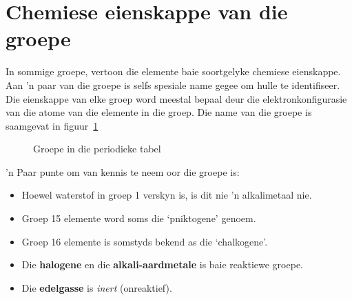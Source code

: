 \section{Chemiese eienskappe van die groepe}
 \label{m38760*secfhsst!!!underscore!!!id1062}
            \nopagebreak
            \label{m38760*id261554} In sommige groepe, vertoon die elemente baie soortgelyke chemiese eienskappe. Aan 'n paar van die groepe is selfs spesiale name gegee om hulle te identifiseer. Die eienskappe van elke groep word meestal bepaal deur die elektronkonfigurasie van die atome van die elemente in die groep. Die name van die groepe is saamgevat in figuur~\ref{fig:atom:periodic}\par
\begin{figure}[H]

\begin{center}
\end{center}

\caption{Groepe in die periodieke tabel}
\label{fig:atom:periodic}
\end{figure}  
'n Paar punte om van kennis te neem oor die groepe is:
        \label{m38757*id261581}\begin{itemize}[noitemsep]
            \label{m38757*uid135}\item Hoewel waterstof in groep 1 verskyn is, is dit nie 'n alkalimetaal nie.
\item Groep 15 elemente word soms die ‘pniktogene’ genoem.
\label{m38757*id6232}\item Groep 16 elemente is somstyds bekend as die ‘chalkogene’.
\label{m38757*uid142}\item Die \textbf{halogene} en die \textbf{alkali-aardmetale} is baie reaktiewe groepe.
\label{m38757*uid143}\item Die \textbf{edelgasse} is \textsl{inert} (onreaktief).   
\end{itemize}            

